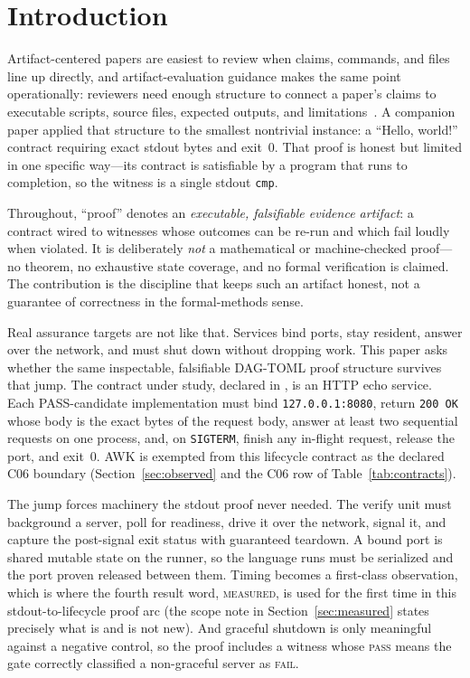 \documentclass[11pt,letterpaper]{article}
\newcommand{\dagtoml}{DAG-TOML}
\newcommand{\measured}{\textsc{measured}}
\begin{document}
\section{Introduction}

Artifact-centered papers are easiest to review when claims, commands,
and files line up directly, and artifact-evaluation guidance makes the
same point operationally: reviewers need enough structure to connect a
paper's claims to executable scripts, source files, expected outputs,
and limitations~\cite{acmBadging2020,poplArtifact2023}. A companion
paper applied that structure to the smallest nontrivial instance: a
``Hello, world!'' contract requiring exact stdout bytes and exit~0.
That proof is honest but limited in one specific way---its contract is
satisfiable by a program that runs to completion, so the witness is a
single stdout \texttt{cmp}.

Throughout, ``proof'' denotes an \emph{executable, falsifiable evidence
artifact}: a contract wired to witnesses whose outcomes can be re-run and
which fail loudly when violated. It is deliberately \emph{not} a mathematical
or machine-checked proof---no theorem, no exhaustive state coverage, and no
formal verification is claimed. The contribution is the discipline that keeps
such an artifact honest, not a guarantee of correctness in the formal-methods
sense.

Real assurance targets are not like that. Services bind ports, stay
resident, answer over the network, and must shut down without dropping
work. This paper asks whether the same inspectable, falsifiable
\dagtoml{} proof structure survives that jump. The contract under study,
declared in , is an HTTP echo
service. Each PASS-candidate implementation must bind
\texttt{127.0.0.1:8080}, return \texttt{200 OK} whose body is the exact
bytes of the request body, answer at least two sequential requests on one
process, and, on \texttt{SIGTERM}, finish any in-flight request, release
the port, and exit~0. AWK is exempted from this lifecycle contract as the
declared C06 boundary (Section~\ref{sec:observed} and the C06 row of
Table~\ref{tab:contracts}).

The jump forces machinery the stdout proof never needed. The verify
unit must background a server, poll for readiness, drive it over the
network, signal it, and capture the post-signal exit status with
guaranteed teardown. A bound port is shared mutable state on the runner,
so the language runs must be serialized and the port proven released
between them. Timing becomes a first-class observation, which is where
the fourth result word, \measured{}, is used for the first time in this
stdout-to-lifecycle proof arc (the scope note in
Section~\ref{sec:measured} states precisely what is and is not new). And
graceful shutdown is only meaningful against a negative
control, so the proof includes a witness whose \textsc{pass} means the
gate correctly classified a non-graceful server as \textsc{fail}.
\end{document}
